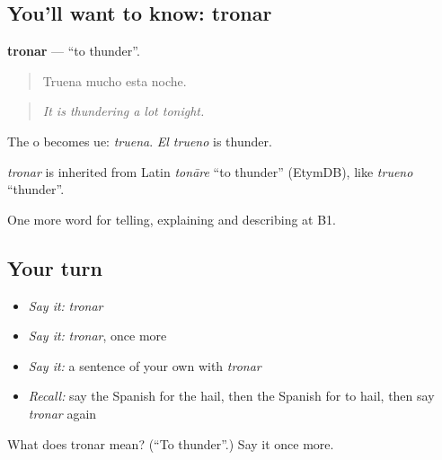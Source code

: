 \subsection*{You'll want to know: tronar}
\textbf{tronar} — \textquotedblleft{}to thunder\textquotedblright{}.

\begin{quote}
Truena mucho esta noche.
\end{quote}

\begin{quote}
\emph{It is thundering a lot tonight.}
\end{quote}

The o becomes ue: \emph{truena}. \emph{El trueno} is thunder.

\begin{cousinweb}
\emph{tronar} is inherited from Latin \emph{tonāre} \textquotedblleft{}to thunder\textquotedblright{} (EtymDB), like \emph{trueno} \textquotedblleft{}thunder\textquotedblright{}.
\end{cousinweb}

\begin{grammarlens}[title={What you've built}]
One more word for telling, explaining and describing at B1.
\end{grammarlens}

\subsection*{Your turn}
\begin{itemize}
\raggedright
  \item \emph{Say it:} \emph{tronar}
  \item \emph{Say it:} \emph{tronar}, once more
  \item \emph{Say it:} a sentence of your own with \emph{tronar}
  \item \emph{Recall:} say the Spanish for the hail, then the Spanish for to hail, then say \emph{tronar} again
\end{itemize}

\begin{tcolorbox}[breakable,colback=teal!4,colframe=teal!35!black,title={Before you move on}]
What does tronar mean? (\textquotedblleft{}To thunder\textquotedblright{}.) Say it once more.
\end{tcolorbox}
